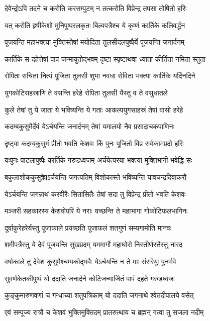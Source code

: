 \twolineshloka
{देवेन्द्रोऽपि तदने च करोति करसम्पुटम्}
{न तत्करोति विप्रेन्द्र तपसा तोषितो हरिः} %

\twolineshloka
{यत् करोति हृषीकेशो मुनिपुष्परलकृतः}
{बिल्वपत्रैश्च ये कृष्णं कार्तिके कलिवर्द्धन} %

\twolineshloka
{पूजयन्ति महाभक्त्या मुक्तिस्तेषां मयोदिता}
{तुलसीदलपुष्पैर्ये पूजयन्ति जनार्दनम्} %

\twolineshloka
{कार्तिके स दहेत्तेषां पापं जन्मायुतोद्भवम्}
{दृष्टा स्पृष्टाथवा ध्याता कीर्तिता नमिता स्तुता} %

\twolineshloka
{रोपिता सचिता नित्यं पूजिता तुलसी शुभा}
{नवधा सेविता भक्त्या कार्तिके यर्दिनदिने} %

\twolineshloka
{युगकोटिसहस्राणि ते वसन्ति हरेहे}
{रोपिता तुलसी यैस्तु व ते वसुधातले} %

\twolineshloka
{कुले तेषां तु ये जाता ये भविष्यन्ति ये गताः}
{आकल्पयुगसाहस्रं तेषां वासो हरेहे} %

\twolineshloka
{कदम्बकुसुमैर्देवं येऽर्चयन्ति जनार्दनम्}
{तेषां यमालयो नैव प्रसादाचकपाणिनः} %

\twolineshloka
{दृष्ट्वा कदम्बकुसुमं प्रीतो भवति केशवः}
{किं पुनः पूजितो विप्र सर्वकामप्रदो हरिः} %

\twolineshloka
{यःपुनः पाटलापुष्पैः कार्तिके गरुडध्वजम्}
{अर्चयेत्परया भक्त्या मुक्तिभागी भवेद्धि सः} %

\twolineshloka
{बकुलाशोककुसुक्र्येऽर्चयन्ति जगत्पतिम्}
{विशोकास्ते भविष्यन्ति यावचन्द्रदिवाकरौ} %

\twolineshloka
{येऽर्चयन्ति जगन्नाथं करवीरैः सितासितैः}
{तेषां सदा तु विप्रेन्द्र प्रीतो भवति केशवः} %

\twolineshloka
{मञ्जरी सहकारस्य केशवोपरि ये नराः}
{यच्छन्ति ते महाभागा गोकोटिफलभागिनः} %

\twolineshloka
{दूर्वाकुरेहरेर्यस्तु पूजाकाले प्रयच्छति}
{पूजाफलं शतगुणं सम्यगामोति मानवः} %

\twolineshloka
{शमीपत्रैस्तु ये देवं पूजयन्ति सुखप्रदम्}
{यममार्गो महाघोरो निस्तीर्णस्तैस्तु नारद} %

\twolineshloka
{वर्षाकाले तु देवेश कुसुमैश्चम्पकोद्भवैः}
{येऽर्चयन्ति न ते माः संसरेयुः पुनर्भवे} %

\twolineshloka
{सुवर्णकेतकीपुष्पं यो ददाति जनार्दने}
{कोटिजन्मार्जितं पापं दहते गरुडध्वजः} %

\twolineshloka
{कुङ्कुमारुणवर्णा च गन्धाच्या शतुपत्रिकाम्}
{यो ददाति जगनाथे श्वेतदीपालये वसेत्} %

\twolineshloka
{एवं सम्पूज्य रात्रौ च केशवं भुक्तिमुक्तिदम्}
{प्रातरुत्थाय च ब्रह्मन् गत्वा तु सजला नदीम्} %

